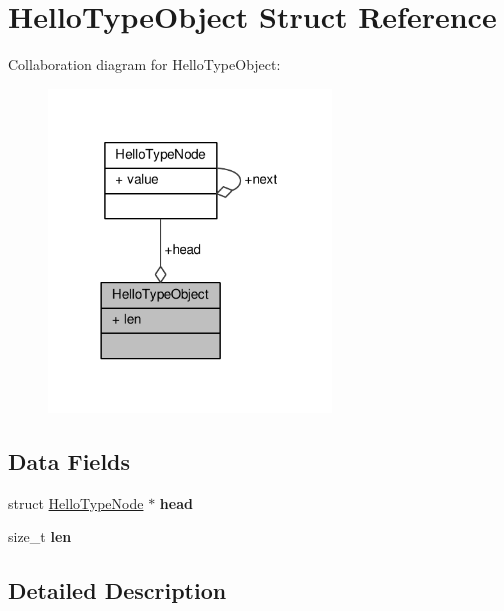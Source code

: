 \hypertarget{structHelloTypeObject}{}\section{Hello\+Type\+Object Struct Reference}
\label{structHelloTypeObject}


Collaboration diagram for Hello\+Type\+Object\+:\nopagebreak
\begin{figure}[H]
\begin{center}
\leavevmode
\includegraphics[width=213pt]{structHelloTypeObject__coll__graph}
\end{center}
\end{figure}
\subsection*{Data Fields}
\begin{DoxyCompactItemize}
\item 
\mbox{\label{structHelloTypeObject_af38a0b3b133d4e05dcb44afc89a35fa1}} 
struct \hyperlink{structHelloTypeNode}{Hello\+Type\+Node} $\ast$ {\bfseries head}
\item 
\mbox{\label{structHelloTypeObject_abf4dafc3ddd55319e83121868159d7bb}} 
size\+\_\+t {\bfseries len}
\end{DoxyCompactItemize}


\subsection{Detailed Description}


